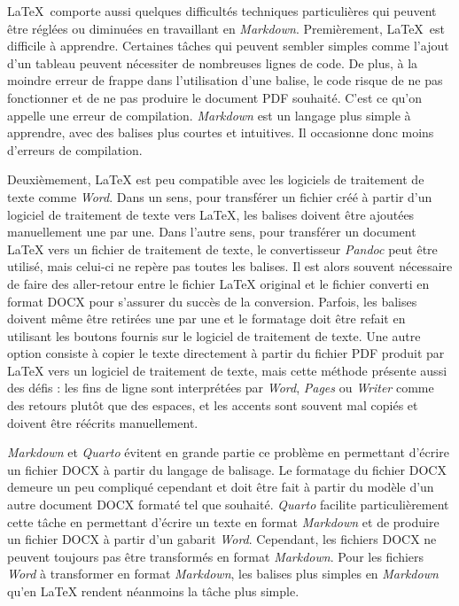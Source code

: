 \documentclass[
  letterpaper,
  DIV=11,
  numbers=noendperiod,
  oneside]{scrreprt}
\begin{document}
\LaTeX{}~comporte aussi quelques difficultés techniques particulières
qui peuvent être réglées ou diminuées en travaillant en \emph{Markdown}.
Premièrement, \LaTeX{}~est difficile à apprendre. Certaines tâches qui
peuvent sembler simples comme l'ajout d'un tableau peuvent nécessiter de
nombreuses lignes de code. De plus, à la moindre erreur de frappe dans
l'utilisation d'une balise, le code risque de ne pas fonctionner et de
ne pas produire le document PDF souhaité. C'est ce qu'on appelle une
erreur de compilation. \emph{Markdown} est un langage plus simple à
apprendre, avec des balises plus courtes et intuitives. Il occasionne
donc moins d'erreurs de compilation.

Deuxièmement, \LaTeX{} est peu compatible avec les logiciels de
traitement de texte comme \emph{Word}. Dans un sens, pour transférer un
fichier créé à partir d'un logiciel de traitement de texte vers
\LaTeX{}, les balises doivent être ajoutées manuellement une par une.
Dans l'autre sens, pour transférer un document \LaTeX{} vers un fichier
de traitement de texte, le convertisseur \emph{Pandoc} peut être
utilisé, mais celui-ci ne repère pas toutes les balises. Il est alors
souvent nécessaire de faire des aller-retour entre le fichier \LaTeX{}
original et le fichier converti en format DOCX pour s'assurer du succès
de la conversion. Parfois, les balises doivent même être retirées une
par une et le formatage doit être refait en utilisant les boutons
fournis sur le logiciel de traitement de texte. Une autre option
consiste à copier le texte directement à partir du fichier PDF produit
par \LaTeX{} vers un logiciel de traitement de texte, mais cette méthode
présente aussi des défis : les fins de ligne sont interprétées par
\emph{Word}, \emph{Pages} ou \emph{Writer} comme des retours plutôt que
des espaces, et les accents sont souvent mal copiés et doivent être
réécrits manuellement.

\emph{Markdown} et \emph{Quarto} évitent en grande partie ce problème en
permettant d'écrire un fichier DOCX à partir du langage de balisage. Le
formatage du fichier DOCX demeure un peu compliqué cependant et doit
être fait à partir du modèle d'un autre document DOCX formaté tel que
souhaité. \emph{Quarto} facilite particulièrement cette tâche en
permettant d'écrire un texte en format \emph{Markdown} et de produire un
fichier DOCX à partir d'un gabarit \emph{Word}. Cependant, les fichiers
DOCX ne peuvent toujours pas être transformés en format \emph{Markdown}.
Pour les fichiers \emph{Word} à transformer en format \emph{Markdown},
les balises plus simples en \emph{Markdown} qu'en \LaTeX{} rendent
néanmoins la tâche plus simple.
\end{document}
